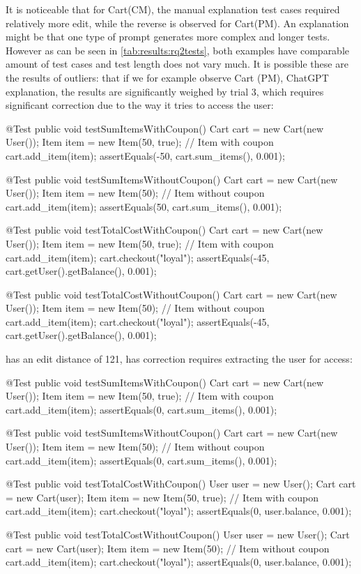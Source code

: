 It is noticeable that for Cart(CM), the manual explanation test cases required relatively more edit, while the reverse
is observed for Cart(PM). An explanation might be that one type of prompt generates more complex and longer tests. However as can be seen in
\cref{tab:results:rq2tests}, both examples have comparable amount of test cases and test length does not vary much.
It is possible these are the results of outliers: that if we for example observe Cart (PM), ChatGPT explanation, the results are significantly weighed by
trial 3, which requires significant correction due to the way it tries to access the user:
\begin{response}
    @Test
    public void testSumItemsWithCoupon() {
        Cart cart = new Cart(new User());
        Item item = new Item(50, true); // Item with coupon
        cart.add_item(item);
        assertEquals(-50, cart.sum_items(), 0.001);
    }

    @Test
    public void testSumItemsWithoutCoupon() {
        Cart cart = new Cart(new User());
        Item item = new Item(50); // Item without coupon
        cart.add_item(item);
        assertEquals(50, cart.sum_items(), 0.001);
    }

    @Test
    public void testTotalCostWithCoupon() {
        Cart cart = new Cart(new User());
        Item item = new Item(50, true); // Item with coupon
        cart.add_item(item);
        cart.checkout("loyal");
        assertEquals(-45, cart.getUser().getBalance(), 0.001);
    }

    @Test
    public void testTotalCostWithoutCoupon() {
        Cart cart = new Cart(new User());
        Item item = new Item(50); // Item without coupon
        cart.add_item(item);
        cart.checkout("loyal");
        assertEquals(-45, cart.getUser().getBalance(), 0.001);
    }
\end{response}
has an edit distance of 121, has correction requires extracting the user for access:
\begin{response}
    @Test
    public void testSumItemsWithCoupon() {
        Cart cart = new Cart(new User());
        Item item = new Item(50, true); // Item with coupon
        cart.add_item(item);
        assertEquals(0, cart.sum_items(), 0.001);
    }

    @Test
    public void testSumItemsWithoutCoupon() {
        Cart cart = new Cart(new User());
        Item item = new Item(50); // Item without coupon
        cart.add_item(item);
        assertEquals(0, cart.sum_items(), 0.001);
    }

    @Test
    public void testTotalCostWithCoupon() {
        User user = new User();
        Cart cart = new Cart(user);
        Item item = new Item(50, true); // Item with coupon
        cart.add_item(item);
        cart.checkout("loyal");
        assertEquals(0, user.balance, 0.001);
    }

    @Test
    public void testTotalCostWithoutCoupon() {
        User user = new User();
        Cart cart = new Cart(user);
        Item item = new Item(50); // Item without coupon
        cart.add_item(item);
        cart.checkout("loyal");
        assertEquals(0, user.balance, 0.001);
    }
\end{response}
